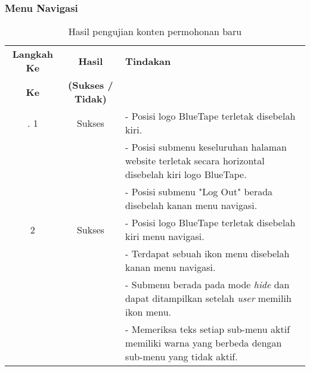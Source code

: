 \subsubsection{Menu Navigasi}
\begin{table}[H]
	\centering 
	\caption{Hasil pengujian konten permohonan baru}
	\label{hasil:MenuNavigasi}
	\begin{tabular}{|c| c| p{}|}
		\toprule
		\textbf{Langkah Ke} & \textbf{Hasil} & \textbf{Tindakan}\\
		\textbf{Ke} & \textbf{(Sukses / Tidak)} &\\
		\midrule.
		1&Sukses& - Posisi logo BlueTape terletak disebelah kiri. \\
		&& - Posisi submenu keseluruhan halaman website terletak secara horizontal disebelah kiri logo BlueTape. \\
		&& - Posisi submenu "Log Out" berada disebelah kanan menu navigasi. \\
		\hline
		2 & Sukses & - Posisi logo BlueTape terletak disebelah kiri menu navigasi. \\
		&& - Terdapat sebuah ikon menu disebelah kanan menu navigasi. \\
		&& - Submenu berada pada mode \textit{hide} dan dapat ditampilkan setelah \textit{user} memilih ikon menu. \\
		&& - Memeriksa teks setiap sub-menu aktif memiliki warna yang berbeda dengan sub-menu yang tidak aktif. \\		
		\bottomrule		
	\end{tabular} 
\end{table}

